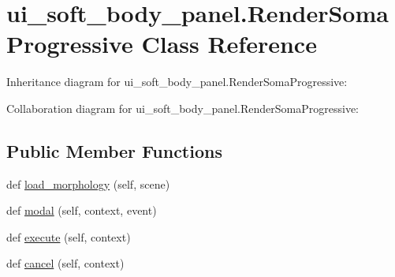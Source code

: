 \hypertarget{classui__soft__body__panel_1_1RenderSomaProgressive}{}\section{ui\+\_\+soft\+\_\+body\+\_\+panel.\+Render\+Soma\+Progressive Class Reference}
\label{classui__soft__body__panel_1_1RenderSomaProgressive}


Inheritance diagram for ui\+\_\+soft\+\_\+body\+\_\+panel.\+Render\+Soma\+Progressive\+:


Collaboration diagram for ui\+\_\+soft\+\_\+body\+\_\+panel.\+Render\+Soma\+Progressive\+:
\subsection*{Public Member Functions}
\begin{DoxyCompactItemize}
\item 
def \hyperlink{classui__soft__body__panel_1_1RenderSomaProgressive_a5cc0467dbcb4e1482fa7c410691d4794}{load\+\_\+morphology} (self, scene)
\item 
def \hyperlink{classui__soft__body__panel_1_1RenderSomaProgressive_a6074218526ca3281715cef7f3c48a93a}{modal} (self, context, event)
\item 
def \hyperlink{classui__soft__body__panel_1_1RenderSomaProgressive_a782ed3f97b392e55259aeed1537fd286}{execute} (self, context)
\item 
def \hyperlink{classui__soft__body__panel_1_1RenderSomaProgressive_a0336ecc11d4a2ae244907d39a3b855b1}{cancel} (self, context)
\end{DoxyCompactItemize}
